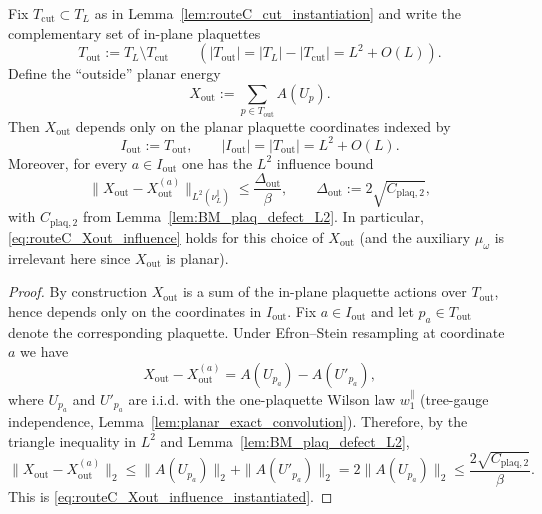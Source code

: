 \begin{lemma}\label{lem:routeC_Xout_influence_instantiation}
Fix $T_{\mathrm{cut}}\subset T_L$ as in Lemma~\ref{lem:routeC_cut_instantiation} and write the complementary set of in-plane plaquettes
\[
T_{\mathrm{out}}:=T_L\setminus T_{\mathrm{cut}}\qquad (|T_{\mathrm{out}}|=|T_L|-|T_{\mathrm{cut}}|=L^2+O(L)).
\]
Define the ``outside'' planar energy
\begin{equation}\label{eq:routeC_Xout_def}
X_{\mathrm{out}}:=\sum_{p\in T_{\mathrm{out}}} A(U_p).
\end{equation}
Then $X_{\mathrm{out}}$ depends only on the planar plaquette coordinates indexed by
\begin{equation}\label{eq:routeC_Iout_def}
I_{\mathrm{out}}:=T_{\mathrm{out}},\qquad |I_{\mathrm{out}}|=|T_{\mathrm{out}}|=L^2+O(L).
\end{equation}
Moreover, for every $a\in I_{\mathrm{out}}$ one has the $L^2$ influence bound
\begin{equation}\label{eq:routeC_Xout_influence_instantiated}
\bigl\|X_{\mathrm{out}}-X_{\mathrm{out}}^{(a)}\bigr\|_{L^2(\nu_L^{\parallel})}\le \frac{\Delta_{\mathrm{out}}}{\beta},
\qquad \Delta_{\mathrm{out}}:=2\sqrt{C_{\mathrm{plaq},2}},
\end{equation}
with $C_{\mathrm{plaq},2}$ from Lemma~\ref{lem:BM_plaq_defect_L2}. In particular, \eqref{eq:routeC_Xout_influence} holds for this choice of $X_{\mathrm{out}}$ (and the auxiliary $\mu_\omega$ is irrelevant here since $X_{\mathrm{out}}$ is planar).
\end{lemma}
\begin{proof}
By construction $X_{\mathrm{out}}$ is a sum of the in-plane plaquette actions over $T_{\mathrm{out}}$, hence depends only on the coordinates in $I_{\mathrm{out}}$.
Fix $a\in I_{\mathrm{out}}$ and let $p_a\in T_{\mathrm{out}}$ denote the corresponding plaquette.
Under Efron--Stein resampling at coordinate $a$ we have
\[
X_{\mathrm{out}}-X_{\mathrm{out}}^{(a)}=A(U_{p_a})-A(U'_{p_a}),
\]
where $U_{p_a}$ and $U'_{p_a}$ are i.i.d. with the one-plaquette Wilson law $w_1^{\parallel}$ (tree-gauge independence, Lemma~\ref{lem:planar_exact_convolution}).
Therefore, by the triangle inequality in $L^2$ and Lemma~\ref{lem:BM_plaq_defect_L2},
\[
\bigl\|X_{\mathrm{out}}-X_{\mathrm{out}}^{(a)}\bigr\|_2
\le \|A(U_{p_a})\|_2+\|A(U'_{p_a})\|_2
=2\|A(U_{p_a})\|_2
\le \frac{2\sqrt{C_{\mathrm{plaq},2}}}{\beta}.
\]
This is \eqref{eq:routeC_Xout_influence_instantiated}.
\end{proof}


